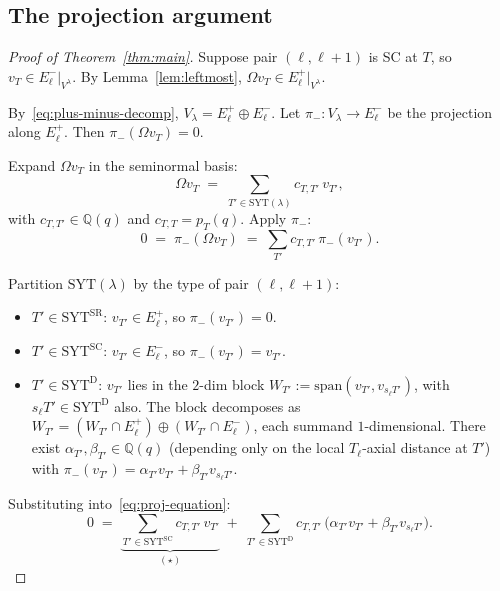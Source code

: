 \documentclass[11pt]{article}
\theoremstyle{definition}
\newcommand{\Vlam}{V^\lambda}
\newcommand{\Om}{\Omega}
\newcommand{\SYT}{\mathrm{SYT}}
\newcommand{\Eplus}{E^+}
\newcommand{\Eminus}{E^-}
\newcommand{\pT}{p_T}
\begin{document}
\subsection*{The projection argument}

\begin{proof}[Proof of Theorem~\ref{thm:main}]
Suppose pair $(\ell, \ell+1)$ is SC at $T$, so $v_T \in \Eminus_\ell|_{\Vlam}$.
By Lemma~\ref{lem:leftmost}, $\Om v_T \in \Eplus_\ell|_{\Vlam}$.

By~\eqref{eq:plus-minus-decomp}, $V_\lambda = \Eplus_\ell \oplus \Eminus_\ell$.
Let $\pi_-: V_\lambda \to \Eminus_\ell$ be the projection along $\Eplus_\ell$.
Then $\pi_-(\Om v_T) = 0$.

Expand $\Om v_T$ in the seminormal basis:
\begin{equation}\label{eq:expansion}
   \Om v_T \;=\; \sum_{T' \in \SYT(\lambda)} c_{T,T'} \, v_{T'},
\end{equation}
with $c_{T,T'} \in \mathbb{Q}(q)$ and $c_{T,T} = \pT(q)$. Apply $\pi_-$:
\begin{equation}\label{eq:proj-equation}
   0 \;=\; \pi_-(\Om v_T) \;=\; \sum_{T'} c_{T,T'} \, \pi_-(v_{T'}).
\end{equation}

Partition $\SYT(\lambda)$ by the type of pair $(\ell, \ell+1)$:
\begin{itemize}[topsep=0.2em,itemsep=0.1em]
\item $T' \in \SYT^{\mathrm{SR}}$: $v_{T'} \in \Eplus_\ell$, so $\pi_-(v_{T'}) = 0$.
\item $T' \in \SYT^{\mathrm{SC}}$: $v_{T'} \in \Eminus_\ell$, so $\pi_-(v_{T'}) = v_{T'}$.
\item $T' \in \SYT^{\mathrm{D}}$: $v_{T'}$ lies in the $2$-dim block
   $W_{T'} := \mathrm{span}(v_{T'}, v_{s_\ell T'})$, with
   $s_\ell T' \in \SYT^{\mathrm{D}}$ also. The block decomposes as
   $W_{T'} = (W_{T'} \cap \Eplus_\ell) \oplus (W_{T'} \cap \Eminus_\ell)$,
   each summand $1$-dimensional. There exist
   $\alpha_{T'}, \beta_{T'} \in \mathbb{Q}(q)$ (depending only on the local
   $T_\ell$-axial distance at $T'$) with
   $\pi_-(v_{T'}) = \alpha_{T'} v_{T'} + \beta_{T'} v_{s_\ell T'}$.
\end{itemize}

Substituting into~\eqref{eq:proj-equation}:
\begin{equation}\label{eq:proj-expanded}
   0 \;=\; \underbrace{\sum_{T' \in \SYT^{\mathrm{SC}}} c_{T,T'}\, v_{T'}}_{(\star)}
   \;+\; \sum_{T' \in \SYT^{\mathrm{D}}} c_{T,T'}\,\bigl(\alpha_{T'} v_{T'} + \beta_{T'} v_{s_\ell T'}\bigr).
\end{equation}


\end{proof}
\end{document}
